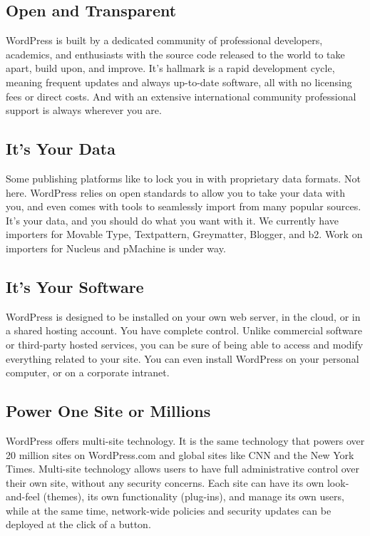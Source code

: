 \subsection{Open and Transparent}

WordPress is built by a dedicated community of professional developers, academics, and enthusiasts with the source code released to the world to take apart, build upon, and improve. It’s hallmark is a rapid development cycle, meaning frequent updates and always up-to-date software, all with no licensing fees or direct costs. And with an extensive international community professional support is always wherever you are.

\subsection{It's Your Data}

Some publishing platforms like to lock you in with proprietary data formats. Not here. WordPress relies on open standards to allow you to take your data with you, and even comes with tools to seamlessly import from many popular sources. It’s your data, and you should do what you want with it. We currently have importers for Movable Type, Textpattern, Greymatter, Blogger, and b2. Work on importers for Nucleus and pMachine is under way.

\subsection{It's Your Software}

WordPress is designed to be installed on your own web server, in the cloud, or in a shared hosting account. You have complete control. Unlike commercial software or third-party hosted services, you can be sure of being able to access and modify everything related to your site. You can even install WordPress on your personal computer, or on a corporate intranet.

\subsection{Power One Site or Millions}

WordPress offers multi-site technology. It is the same technology that powers over 20 million sites on WordPress.com and global sites like CNN and the New York Times. Multi-site technology allows users to have full administrative control over their own site, without any security concerns. Each site can have its own look-and-feel (themes), its own functionality (plug-ins), and manage its own users, while at the same time, network-wide policies and security updates can be deployed at the click of a button.

